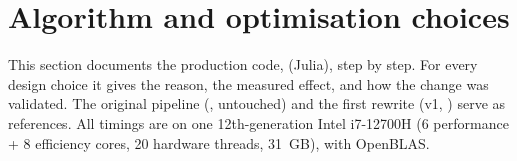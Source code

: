 \section{Algorithm and optimisation choices}
\label{sec:algorithm}

This section documents the production code,  (Julia), step by step. For every
design choice it gives the reason, the measured effect, and how the change was validated. The original pipeline
(, untouched) and the first rewrite (v1, ) serve as references.
All timings are on one 12th-generation Intel i7-12700H (6 performance + 8 efficiency cores, 20 hardware threads, 31~GB),
with OpenBLAS.

